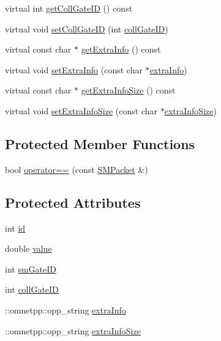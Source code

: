 \begin{DoxyCompactItemize}
\item 
virtual int \hyperlink{classsmart3p_1_1SMPacket_a64547473581a84a343c77f9f4b4257c5}{get\+Coll\+Gate\+ID} () const
\item 
virtual void \hyperlink{classsmart3p_1_1SMPacket_ae1249b367e1c92820a7f79f50efcc348}{set\+Coll\+Gate\+ID} (int \hyperlink{classsmart3p_1_1SMPacket_ae81077057b1f59dab392f09966529047}{coll\+Gate\+ID})
\item 
virtual const char $\ast$ \hyperlink{classsmart3p_1_1SMPacket_a58f21f2e289fbc7910ef3e5ef7d05c3b}{get\+Extra\+Info} () const
\item 
virtual void \hyperlink{classsmart3p_1_1SMPacket_a3ab2306b41ed54f86e97f5163a7f3ae9}{set\+Extra\+Info} (const char $\ast$\hyperlink{classsmart3p_1_1SMPacket_acff575715f936a984686d4bd618570e9}{extra\+Info})
\item 
virtual const char $\ast$ \hyperlink{classsmart3p_1_1SMPacket_a54975c6966ddb5994442161e0b68aa30}{get\+Extra\+Info\+Size} () const
\item 
virtual void \hyperlink{classsmart3p_1_1SMPacket_a4012df901869826bdd19394312489ce8}{set\+Extra\+Info\+Size} (const char $\ast$\hyperlink{classsmart3p_1_1SMPacket_a546cc7b651dd40a4ee98990fabd10f5c}{extra\+Info\+Size})
\end{DoxyCompactItemize}
\subsection*{Protected Member Functions}
\begin{DoxyCompactItemize}
\item 
bool \hyperlink{classsmart3p_1_1SMPacket_a999e29404cc37d5b92ff52ab862d246b}{operator==} (const \hyperlink{classsmart3p_1_1SMPacket}{S\+M\+Packet} \&)
\end{DoxyCompactItemize}
\subsection*{Protected Attributes}
\begin{DoxyCompactItemize}
\item 
int \hyperlink{classsmart3p_1_1SMPacket_af0612d8448370b8919ff415b860725ed}{id}
\item 
double \hyperlink{classsmart3p_1_1SMPacket_aa5596bff5a9720c59788a6766357c8d9}{value}
\item 
int \hyperlink{classsmart3p_1_1SMPacket_a12d57198d78f1b58b027aba4a99cdc3b}{sm\+Gate\+ID}
\item 
int \hyperlink{classsmart3p_1_1SMPacket_ae81077057b1f59dab392f09966529047}{coll\+Gate\+ID}
\item 
\+::omnetpp\+::opp\+\_\+string \hyperlink{classsmart3p_1_1SMPacket_acff575715f936a984686d4bd618570e9}{extra\+Info}
\item 
\+::omnetpp\+::opp\+\_\+string \hyperlink{classsmart3p_1_1SMPacket_a546cc7b651dd40a4ee98990fabd10f5c}{extra\+Info\+Size}
\end{DoxyCompactItemize}


